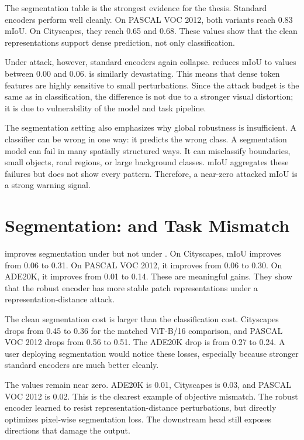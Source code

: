 The segmentation table is the strongest evidence for the thesis. Standard \DINOv encoders perform well cleanly. On PASCAL VOC 2012, both \DINOv variants reach 0.83 mIoU. On Cityscapes, they reach 0.65 and 0.68. These values show that the clean representations support dense prediction, not only classification.

Under attack, however, standard encoders again collapse. \EmbedAttack reduces mIoU to values between 0.00 and 0.06. \SegPGD is similarly devastating. This means that dense token features are highly sensitive to small perturbations. Since the attack budget is the same as in classification, the difference is not due to a stronger visual distortion; it is due to vulnerability of the model and task pipeline.

The segmentation setting also emphasizes why global robustness is insufficient. A classifier can be wrong in one way: it predicts the wrong class. A segmentation model can fail in many spatially structured ways. It can misclassify boundaries, small objects, road regions, or large background classes. mIoU aggregates these failures but does not show every pattern. Therefore, a near-zero attacked mIoU is a strong warning signal.

\section{Segmentation: \DeACL and Task Mismatch}

\DeACL improves segmentation under \EmbedAttack but not under \SegPGD. On Cityscapes, \EmbedAttack mIoU improves from 0.06 to 0.31. On PASCAL VOC 2012, it improves from 0.06 to 0.30. On ADE20K, it improves from 0.01 to 0.14. These are meaningful gains. They show that the robust encoder has more stable patch representations under a representation-distance attack.

The clean segmentation cost is larger than the classification cost. Cityscapes drops from 0.45 to 0.36 for the matched \DINO ViT-B/16 comparison, and PASCAL VOC 2012 drops from 0.56 to 0.51. The ADE20K drop is from 0.27 to 0.24. A user deploying segmentation would notice these losses, especially because stronger standard \DINOv encoders are much better cleanly.

The \SegPGD values remain near zero. ADE20K is 0.01, Cityscapes is 0.03, and PASCAL VOC 2012 is 0.02. This is the clearest example of objective mismatch. The robust encoder learned to resist representation-distance perturbations, but \SegPGD directly optimizes pixel-wise segmentation loss. The downstream head still exposes directions that damage the output.

